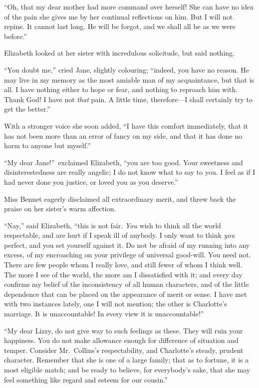 \documentclass[12pt,english,oneside]{book}
\begin{document}
{}``Oh, that my dear mother had more command over herself! She can
have no idea of the pain she gives me by her continual reflections
on him. But I will not repine. It cannot last long. He will be forgot,
and we shall all be as we were before.''

Elizabeth looked at her sister with incredulous solicitude, but said
nothing.

{}``You doubt me,'' cried Jane, slightly colouring; {}``indeed,
you have no reason. He may live in my memory as the most amiable man
of my acquaintance, but that is all. I have nothing either to hope
or fear, and nothing to reproach him with. Thank God! I have not \textit{that}
pain. A little time, therefore\mbox{---}I shall certainly try to
get the better.''

With a stronger voice she soon added, {}``I have this comfort immediately,
that it has not been more than an error of fancy on my side, and that
it has done no harm to anyone but myself.''

{}``My dear Jane!''\ exclaimed Elizabeth, {}``you are too good.
Your sweetness and disinterestedness are really angelic; I do not
know what to say to you. I feel as if I had never done you justice,
or loved you as you deserve.''

Miss Bennet eagerly disclaimed all extraordinary merit, and threw
back the praise on her sister's warm affection.

{}``Nay,'' said Elizabeth, {}``this is not fair. \textit{You} wish
to think all the world respectable, and are hurt if I speak ill of
anybody. I only want to think \textit{you} perfect, and you set yourself
against it. Do not be afraid of my running into any excess, of my
encroaching on your privilege of universal good-will. You need not.
There are few people whom I really love, and still fewer of whom I
think well. The more I see of the world, the more am I dissatisfied
with it; and every day confirms my belief of the inconsistency of
all human characters, and of the little dependence that can be placed
on the appearance of merit or sense. I have met with two instances
lately, one I will not mention; the other is Charlotte's marriage.
It is unaccountable! In every view it is unaccountable!''\ 

{}``My dear Lizzy, do not give way to such feelings as these. They
will ruin your happiness. You do not make allowance enough for difference
of situation and temper. Consider Mr.\ Collins's respectability,
and Charlotte's steady, prudent character. Remember that she is one
of a large family; that as to fortune, it is a most eligible match;
and be ready to believe, for everybody's sake, that she may feel something
like regard and esteem for our cousin.''
\end{document}
